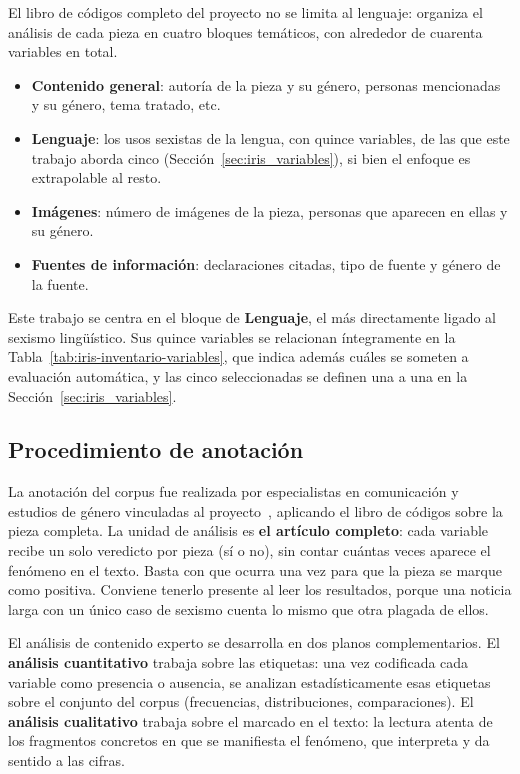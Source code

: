 El libro de códigos completo del proyecto no se limita al lenguaje: organiza el
análisis de cada pieza en cuatro bloques temáticos, con alrededor de cuarenta
variables en total.

\begin{itemize}
    \item \textbf{Contenido general}: autoría de la pieza y su género, personas
    mencionadas y su género, tema tratado, etc.
    \item \textbf{Lenguaje}: los usos sexistas de la lengua, con quince variables, de
    las que este trabajo aborda cinco (Sección~\ref{sec:iris_variables}), si bien
    el enfoque es extrapolable al resto.
    \item \textbf{Imágenes}: número de imágenes de la pieza, personas que
    aparecen en ellas y su género.
    \item \textbf{Fuentes de información}: declaraciones citadas, tipo de fuente y
    género de la fuente.
\end{itemize}

Este trabajo se centra en el bloque de \textbf{Lenguaje}, el más directamente
ligado al sexismo lingüístico. Sus quince variables se relacionan íntegramente en
la Tabla~\ref{tab:iris-inventario-variables}, que indica además cuáles se
someten a evaluación automática, y las cinco seleccionadas se definen una a una
en la Sección~\ref{sec:iris_variables}.

\subsection{Procedimiento de anotación}

La anotación del corpus fue realizada por especialistas en comunicación y
estudios de género vinculadas al proyecto~\cite{sainzdebaranda2026}, aplicando el
libro de códigos sobre la pieza completa. La unidad de análisis es \textbf{el
artículo completo}: cada variable recibe un solo veredicto por pieza (sí o no),
sin contar cuántas veces aparece el fenómeno en el texto. Basta con que ocurra una
vez para que la pieza se marque como positiva. Conviene tenerlo presente al leer
los resultados, porque una noticia larga con un único caso de sexismo cuenta lo
mismo que otra plagada de ellos.

El análisis de contenido experto se desarrolla en dos planos complementarios. El
\textbf{análisis cuantitativo} trabaja sobre las etiquetas: una vez codificada
cada variable como presencia o ausencia, se analizan estadísticamente esas
etiquetas sobre el conjunto del corpus (frecuencias, distribuciones,
comparaciones). El \textbf{análisis cualitativo} trabaja sobre el marcado en el
texto: la lectura atenta de los fragmentos concretos en que se manifiesta el
fenómeno, que interpreta y da sentido a las cifras.

